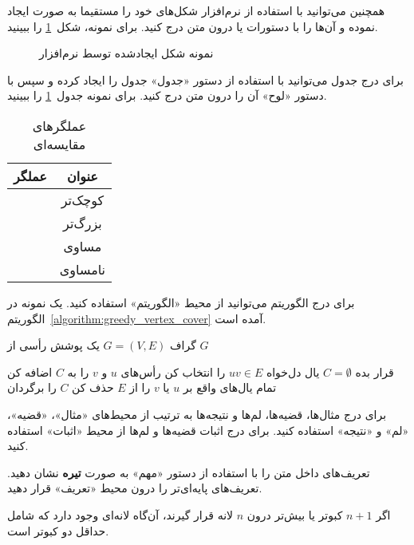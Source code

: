 \bigskip
همچنین می‌توانید با استفاده از نرم‌افزار  شکل‌های خود را مستقیما
به صورت  ایجاد نموده و آن‌ها را با دستورات  یا   
درون متن درج کنید. برای نمونه، شکل~\ref{figure:directional_graph} را ببینید.


\begin{figure}[ht]
\caption{نمونه شکل ایجادشده توسط نرم‌افزار }
\label{figure:directional_graph}
\end{figure}

برای درج جدول می‌توانید با استفاده از دستور  «جدول»
جدول را ایجاد کرده و سپس با دستور  «لوح»  آن را درون متن درج کنید.
برای نمونه جدول~\ref{table:comparative_operators} را ببینید.

\vspace{1.5em}

\begin{table}[ht]
\centering
\caption{عملگرهای مقایسه‌ای}

\begin{tabular}{|c|c|}
\hline 
\bf عملگر & \bf عنوان \\ 
\hline \hline 
\lr{\tt{<}} & کوچک‌تر \\ 
\lr{\tt{>}} & بزرگ‌تر \\
\lr{\tt{==}} &  مساوی \\ 
\lr{\tt{<>}} & نامساوی \\ 
\hline
\end{tabular}

\label{table:comparative_operators}
\end{table}

برای درج الگوریتم می‌توانید از محیط «الگوریتم» استفاده کنید.
یک نمونه در الگوریتم~\ref{algorithm:greedy_vertex_cover} آمده است.

\begin{algorithm}
\label{algorithm:greedy_vertex_cover}
\begin{algorithmic}[1]
\Require گراف $G=(V, E)$
\Ensure یک پوشش رأسی از $G$

\State قرار بده $C = \emptyset$  %
\State یال دل‌‌خواه $uv \in E$ را انتخاب کن
\State رأس‌های $u$ و $v$ را به $C$ اضافه کن
\State تمام یال‌های واقع بر $u$ یا $v$ را از $E$ حذف کن
\EndWhile
\State $C$ را برگردان
\end{algorithmic}
\end{algorithm}

برای درج مثال‌ها، قضیه‌ها، لم‌ها و نتیجه‌ها به ترتیب از محیط‌های
«مثال»، «قضیه»، «لم» و «نتیجه» استفاده کنید.
برای درج اثبات قضیه‌ها و لم‌ها  از محیط «اثبات» استفاده کنید.

تعریف‌های داخل متن را با استفاده از دستور «مهم» به صورت \textbf{تیره‌} نشان دهید.
تعریف‌های پایه‌ای‌تر را درون محیط «تعریف» قرار دهید.

\begin{تعریف}
اگر $n+1$ کبوتر یا بیش‌تر درون  $n$ لانه قرار گیرند، آن‌گاه لانه‌ای 
وجود دارد که شامل حداقل دو کبوتر است.
\end{تعریف}
